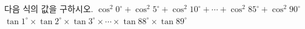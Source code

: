 다음 식의 값을 구하시오.
 $\cos^2 0^\circ+\cos^2 5^\circ+\cos^2 10^\circ+\cdots+\cos^2 85^\circ+\cos^2 90^\circ$
 $\tan 1^\circ\times\tan 2^\circ\times\tan 3^\circ\times\cdots\times\tan 88^\circ\times\tan 89^\circ$
